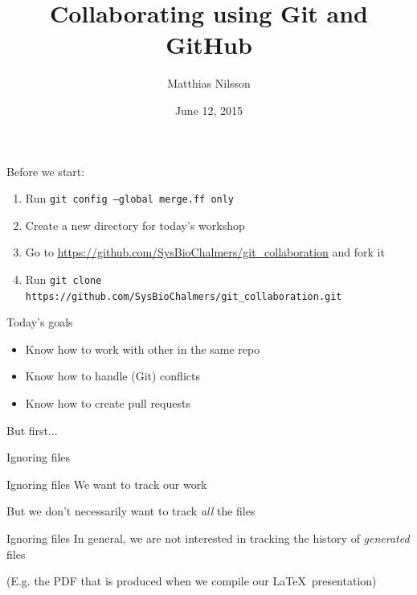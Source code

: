 \documentclass{beamer}
\title{Collaborating using Git and GitHub}
\author{Matthias Nilsson}
\institute{Chalmers University of Technology}
\date{June 12, 2015}
\newcommand{\fmtcmd}[1]{\texttt{#1}}
\begin{document}
{
\begin{frame}
\maketitle
\end{frame}
}

\begin{frame}{}
  Before we start:

  \small
  \begin{enumerate}
    \item Run \fmtcmd{git config --global merge.ff only}
    \item Create a new directory for today's workshop
    \item Go to \url{https://github.com/SysBioChalmers/git_collaboration} and fork it
    \item Run \scriptsize\fmtcmd{git clone https://github.com/SysBioChalmers/git_collaboration.git}
  \end{enumerate}
\end{frame}

\begin{frame}{Today's goals}
  \begin{itemize}
  \item Know how to work with other in the same repo
  \item Know how to handle (Git) conflicts
  \item Know how to create pull requests
  \end{itemize}
\end{frame}

\begin{frame}{}
  \center
  \Huge But first...
\end{frame}

\begin{frame}{}
  \center
  \Huge Ignoring files
\end{frame}

\begin{frame}{Ignoring files}
  \center
  \Huge We want to track our work
  \pause

  \huge But we don't necessarily want to track \emph{all} the files
\end{frame}

\begin{frame}{Ignoring files}
  \center
  \huge In general, we are not interested in tracking the history of
  \emph{generated} files
  \pause

  \Large (E.g. the PDF that is produced when we compile our \LaTeX\ 
  presentation)
\end{frame}
\end{document}
